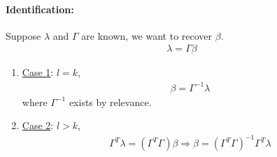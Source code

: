 \documentclass[11pt]{elegantbook}
\begin{document}
\paragraph*{Identification:} Suppose $\lambda$ and $\Gamma$ are known, we want to recover $\beta$.
\begin{equation}
    \begin{aligned}
        \lambda=\Gamma\beta
    \end{aligned}
    \nonumber
\end{equation}
\begin{enumerate}
    \item \underline{Case 1}: $l=k$,
    \begin{equation}
        \begin{aligned}
            \beta=\Gamma^{-1}\lambda
        \end{aligned}
        \nonumber
    \end{equation}
    where $\Gamma^{-1}$ exists by relevance.
    \item \underline{Case 2}: $l>k$,
    \begin{equation}
        \begin{aligned}
            \Gamma^T\lambda=(\Gamma^T\Gamma)\beta \Rightarrow \beta=(\Gamma^T\Gamma)^{-1}\Gamma^T\lambda
        \end{aligned}
        \nonumber
    \end{equation}
\end{enumerate}
\end{document}
